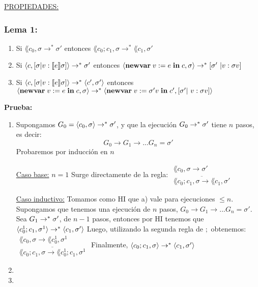     \PN \underline{PROPIEDADES:}
    \subsubsection*{\textbf{Lema 1:}}
      \begin{enumerate}
        \item Si $\lang{c_0, \sigma} \rightarrow^{\ast} \sigma'$ entonces $\lang{c_0;c_1, \sigma} \rightarrow^{\ast} \lang{c_1, \sigma'}$
        \item Si $\langle c, [\sigma | v : \llbracket e\rrbracket \sigma]\rangle \rightarrow^{\ast} \sigma'$ entonces $\lang{\newvar{v := e}{c}, \sigma} \rightarrow^{\ast} [\sigma' | v : \sigma v]$
        \item Si $\langle c, [\sigma | v : \llbracket e\rrbracket \sigma]\rangle \rightarrow^{\ast} \langle c', \sigma'\rangle$ entonces $\lang{\newvar{v := e}{c}, \sigma} \rightarrow^{\ast} \lang{\newvar{v := \sigma' v}{c'}, [\sigma' | v : \sigma v]}$
      \end{enumerate}
    \PN \textbf{Prueba:}
      \begin{enumerate}
        \item Supongamos $G_0 = \langle c_0, \sigma\rangle \rightarrow^{\ast} \sigma'$, y que la ejecución $G_0 \rightarrow^{\ast} \sigma'$ tiene $n$ pasos, es decir:
        \[
          G_0 \rightarrow G_1 \rightarrow ... G_n = \sigma'
        \]
        \PN Probaremos por inducción en $n$

        \underline{Caso base:} $n = 1$ Surge directamente de la regla:
        $\begin{array}{cll}
          \lang{c_0, \sigma} \rightarrow \sigma' \\
          \overline{\lang{c_0;c_1, \sigma} \rightarrow \lang{c_1, \sigma'}}
        \end{array}$

        \underline{Caso inductivo:} Tomamos como HI que a) vale para ejecuciones $\leq n$.
        \PN Supongamos que tenemos una ejecución de $n$ pasos, $G_0 \rightarrow G_1 \rightarrow ... G_n = \sigma'$.
        \PN Sea $G_1 \rightarrow^{\ast} \sigma'$, de $n-1$ pasos, entonces por HI tenemos que $\langle c_{0}^{1};c_1, \sigma^{1}\rangle \rightarrow^{\ast} \langle c_1, \sigma'\rangle$
        \PN Luego, utilizando la segunda regla de $;$ obtenemos:
        $\begin{array}{cll}
          \lang{c_0, \sigma} \rightarrow \lang{c_{0}^{1}, \sigma^{1}} \\
          \overline{\lang{c_0;c_1, \sigma} \rightarrow \lang{c_{0}^{1}; c_1, \sigma^{1}}}
        \end{array}$
        \PN Finalmente, $\langle c_0;c_1, \sigma\rangle \rightarrow^{\ast} \langle c_1, \sigma'\rangle$

        \item
        \item
      \end{enumerate}

